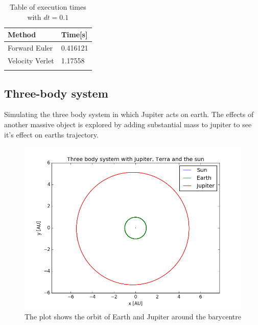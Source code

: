 \begin{table}
\centering
\caption{Table of execution times with $dt = 0.1$ }\label{tab:time}
\begin{tabular}{|l|l|}
\hline
\textbf{Method}  & \textbf{Time[s]} \\
\hline
Forward Euler   & 0.416121 \\
\hline
Velocity Verlet & 1.17558 \\
\hline
\label{tab:comp-time}
\end{tabular}
\end{table}

\subsection{Three-body system}
Simulating the three body system in which Jupiter acts on earth. The effects of another massive object is explored by adding substantial mass to jupiter to see it's effect on earths trajectory.
 
\begin{figure}[H]
\includegraphics[scale=0.7]{figures/three_body}
\caption{The plot shows the orbit of Earth and Jupiter around the barycentre }\label{fig:three}
\end{figure}

